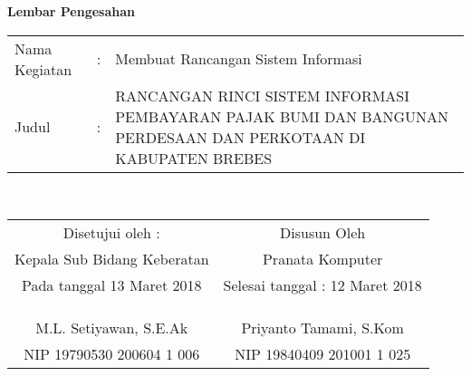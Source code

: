 \begin{center}
{\huge \bfseries Lembar Pengesahan}\\[0.4cm]

\begin{tabular}{l c p{10cm}}
  Nama Kegiatan & : & Membuat Rancangan Sistem Informasi \\
  Judul & : & RANCANGAN RINCI SISTEM INFORMASI PEMBAYARAN PAJAK BUMI DAN BANGUNAN PERDESAAN DAN PERKOTAAN DI KABUPATEN BREBES \\
\end{tabular}\\[2cm]

\begin{tabular}{c c}
  Disetujui oleh : & Disusun Oleh \\
  Kepala Sub Bidang Keberatan & Pranata Komputer \\
  Pada tanggal 13 Maret 2018 & Selesai tanggal : 12 Maret 2018 \\
  & \\
  & \\
  & \\
  M.L. Setiyawan, S.E.Ak & Priyanto Tamami, S.Kom \\
  NIP 19790530 200604 1 006 & NIP 19840409 201001 1 025
\end{tabular}

\end{center}